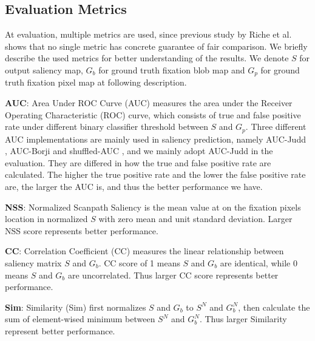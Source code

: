 \documentclass[letterpaper, 10 pt, conference]{ieeeconf}  %
\begin{document}
\subsection{Evaluation Metrics}

\par At evaluation, multiple metrics are used, since previous study by Riche et al. \cite{b32} shows that no single metric has concrete guarantee of fair comparison. We briefly describe the used metrics for better understanding of the results. We denote $S$ for output saliency map, $G_{b}$ for ground truth fixation blob map and $G_{p}$ for ground truth fixation pixel map at following description.

\par \textbf{AUC}: Area Under ROC Curve (AUC) measures the area under the Receiver Operating Characteristic (ROC) curve, which consists of true and false positive rate under different binary classifier threshold between $S$ and $G_{p}$. Three different AUC implementations are mainly used in saliency prediction, namely AUC-Judd \cite{b32}, AUC-Borji \cite{b33} and shuffled-AUC \cite{b34}, and we mainly adopt AUC-Judd in the evaluation. They are differed in how the true and false positive rate are calculated. The higher the true positive rate and the lower the false positive rate are, the larger the AUC is, and thus the better performance we have.

\par \textbf{NSS}: Normalized Scanpath Saliency \cite{35} is the mean value at on the fixation pixels location in normalized $S$ with zero mean and unit standard deviation. Larger NSS score represents better performance.

\par \textbf{CC}: Correlation Coefficient (CC) measures the linear relationship between saliency matrix $S$ and $G_{b}$. CC score of 1 means $S$ and $G_{b}$ are identical, while 0 means $S$ and $G_{b}$ are uncorrelated. Thus larger CC score represents better performance.

\par \textbf{Sim}: Similarity (Sim) first normalizes $S$ and $G_{b}$ to $S^{N}$ and $G^{N}_{b}$, then calculate the sum of element-wised minimum between $S^{N}$ and $G^{N}_{b}$. Thus larger Similarity represent better performance.
\end{document}
